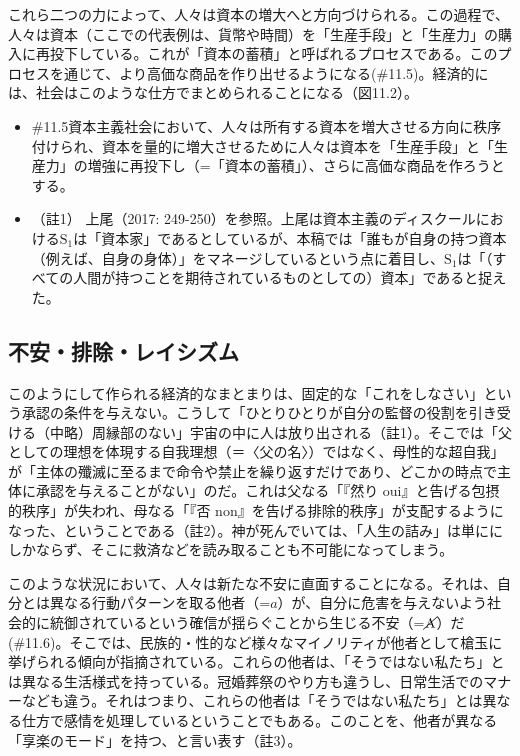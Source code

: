 これら二つの力によって、人々は資本の増大へと方向づけられる。この過程で、人々は資本（ここでの代表例は、貨幣や時間）を「生産手段」と「生産力」の購入に再投下している。これが「資本の蓄積」と呼ばれるプロセスである。このプロセスを通じて、より高価な商品を作り出せるようになる(\#11.5)。経済的には、社会はこのような仕方でまとめられることになる（図11.2）。

\begin{note}{}
  \begin{itemize}
    \tightlist
    \item{\#11.5}資本主義社会において、人々は所有する資本を増大させる方向に秩序付けられ、資本を量的に増大させるために人々は資本を「生産手段」と「生産力」の増強に再投下し（=「資本の蓄積」）、さらに高価な商品を作ろうとする。
  \end{itemize}
\end{note}

\begin{itemize}
\tightlist
\item
  （註1） 上尾（2017:
  249-250）\cite{Ueo}を参照。上尾は資本主義のディスクールにおける\(\textrm{S}_1\)は「資本家」であるとしているが、本稿では「誰もが自身の持つ資本（例えば、自身の身体）」をマネージしているという点に着目し、\(\textrm{S}_1\)は「（すべての人間が持つことを期待されているものとしての）資本」であると捉えた。
\end{itemize}

\subsection{不安・排除・レイシズム}\label{ux4e0dux5b89ux6392ux9664ux30ecux30a4ux30b7ux30baux30e0}

このようにして作られる経済的なまとまりは、固定的な「これをしなさい」という承認の条件を与えない。こうして「ひとりひとりが自分の監督の役割を引き受ける（中略）周縁部のない」宇宙の中に人は放り出される（註1）。そこでは「父としての理想を体現する自我理想（＝〈父の名〉）ではなく、母性的な超自我」が「主体の殲滅に至るまで命令や禁止を繰り返すだけであり、どこかの時点で主体に承認を与えることがない」のだ。これは父なる「『然り
oui』と告げる包摂的秩序」が失われ、母なる「『否
non』を告げる排除的秩序」が支配するようになった、ということである（註2）。神が死んでいては、「人生の詰み」は単ににしかならず、そこに救済などを読み取ることも不可能になってしまう。

このような状況において、人々は新たな不安に直面することになる。それは、自分とは異なる行動パターンを取る他者（=\(a\)）が、自分に危害を与えないよう社会的に統御されているという確信が揺らぐことから生じる不安（=\(\cancel{\textrm{A}}\)）だ(\#11.6)。そこでは、民族的・性的など様々なマイノリティが他者として槍玉に挙げられる傾向が指摘されている。これらの他者は、「そうではない私たち」とは異なる生活様式を持っている。冠婚葬祭のやり方も違うし、日常生活でのマナーなども違う。それはつまり、これらの他者は「そうではない私たち」とは異なる仕方で感情を処理しているということでもある。このことを、他者が異なる「享楽のモード」を持つ、と言い表す（註3）。

